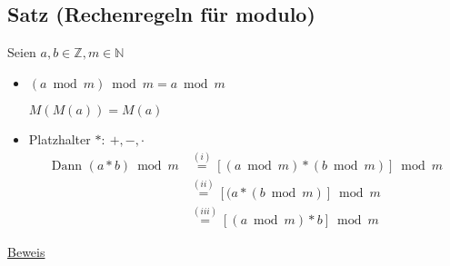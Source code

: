 \documentclass[a4paper, 12pt, twoside] {article}
\begin{document}

\subsection{Satz (Rechenregeln für modulo)} %
Seien $a, b \in \mathbb{Z}, m \in \mathbb{N}$

\begin{itemize}

\item $(a \bmod m) \bmod m = a \bmod m$

$M(M(a)) = M(a)$

\item Platzhalter $*:\ +,-,\cdot$
\begin{align*}
\text{Dann } (a * b) \bmod m  &\overset{(i)}{=}  [(a \bmod m) * (b \bmod m)] \bmod m \\
 &\overset{(ii)}{=}  [(a * (b \bmod m)] \bmod m \\
 &\overset{(iii)}{=}  [(a \bmod m) * b] \bmod m
\end{align*}

\end{itemize}

\underline{Beweis}
\end{document}
